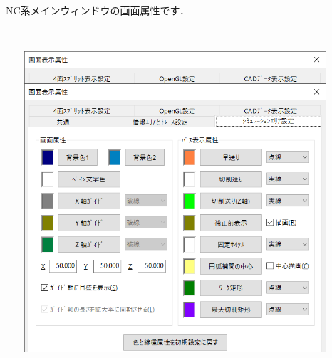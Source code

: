 \begin{minipage}[t]{0.38\textwidth}
　NC系メインウィンドウの画面属性です．
\end{minipage}
\begin{minipage}[t]{0.02\textwidth}
　
\end{minipage}
\begin{minipage}[t]{0.6\textwidth}
\vspace*{-2zh}
\begin{figure}[H]
\centering
\includegraphics[width=\textwidth]{No6/fig/disp3.png}
\label{fig:disp3.png}
\end{figure}
\end{minipage}

